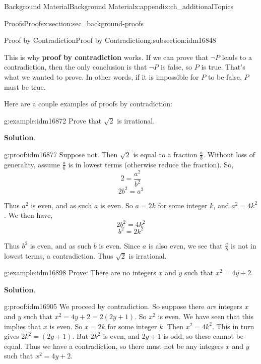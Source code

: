 \documentclass[oneside,10pt,]{book}
\newcommand{\terminology}[1]{\textbf{#1}}
\numberwithin{equation}{chapter}
\begin{document}
\begin{appendixptx}{Background Material}{}{Background Material}{}{}{x:appendix:ch_additionalTopics}
\begin{sectionptx}{Proofs}{}{Proofs}{}{}{x:section:sec_background-proofs}
\begin{subsectionptx}{Proof by Contradiction}{}{Proof by Contradiction}{}{}{g:subsection:idm16848}
\par
This is why \terminology{proof by contradiction} works. If we can prove that \(\neg P\) leads to a contradiction, then the only conclusion is that \(\neg P\) is false, so \(P\) is true. That's what we wanted to prove. In other words, if it is impossible for \(P\) to be false, \(P\) must be true.%
\par
Here are a couple examples of proofs by contradiction:%
\begin{example}{}{g:example:idm16872}%
Prove that \(\sqrt{2}\) is irrational.%
\par\smallskip%
\noindent\textbf{Solution}.\hypertarget{g:solution:idm16876}{}\quad{}\begin{proofptx}{}{g:proof:idm16877}
Suppose not. Then \(\sqrt 2\) is equal to a fraction \(\frac{a}{b}\). Without loss of generality, assume \(\frac{a}{b}\) is in lowest terms (otherwise reduce the fraction). So,%
\begin{equation*}
2 = \frac{a^2}{b^2}
\end{equation*}
%
\begin{equation*}
2b^2 = a^2
\end{equation*}
%
\par
Thus \(a^2\) is even, and as such \(a\) is even. So \(a = 2k\) for some integer \(k\), and \(a^2 = 4k^2\). We then have,%
\begin{equation*}
2b^2 = 4k^2
\end{equation*}
%
\begin{equation*}
b^2 = 2k^2
\end{equation*}
%
\par
Thus \(b^2\) is even, and as such \(b\) is even. Since \(a\) is also even, we see that \(\frac{a}{b}\) is not in lowest terms, a contradiction. Thus \(\sqrt 2\) is irrational.%
\end{proofptx}
\end{example}
\begin{example}{}{g:example:idm16898}%
Prove: There are no integers \(x\) and \(y\) such that \(x^2  = 4y + 2\).%
\par\smallskip%
\noindent\textbf{Solution}.\hypertarget{g:solution:idm16904}{}\quad{}\begin{proofptx}{}{g:proof:idm16905}
We proceed by contradiction. So suppose there \emph{are} integers \(x\) and \(y\) such that \(x^2 = 4y + 2 = 2(2y + 1)\). So \(x^2\) is even. We have seen that this implies that \(x\) is even. So \(x = 2k\) for some integer \(k\). Then \(x^2 = 4k^2\). This in turn gives \(2k^2 = (2y + 1)\). But \(2k^2\) is even, and \(2y + 1\) is odd, so these cannot be equal. Thus we have a contradiction, so there must not be any integers \(x\) and \(y\) such that \(x^2 = 4y + 2\).%

\end{proofptx}
\end{example}
\end{subsectionptx}
\end{sectionptx}
\end{appendixptx}
\end{document}
